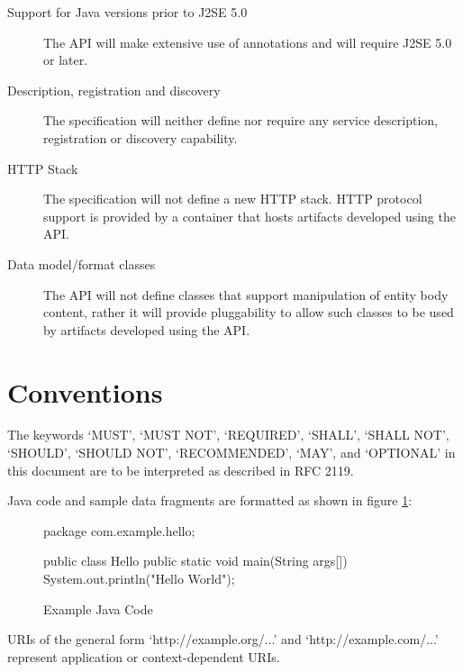 \begin{description}

\item[Support for Java versions prior to J2SE 5.0] The API will make extensive use of annotations and will require J2SE 5.0 or later.

\item[Description, registration and discovery] The specification will neither define nor require any service description, registration or discovery capability.


\item[HTTP Stack] The specification will not define a new HTTP stack. HTTP protocol support is provided by a container that hosts artifacts developed using the API.

\item[Data model/format classes] The API will not define classes that support manipulation of entity body content, rather it will provide pluggability to allow such classes to be used by artifacts developed using the API.

\end{description}

\section{Conventions}

The keywords `MUST', `MUST NOT', `REQUIRED', `SHALL', `SHALL NOT', `SHOULD', `SHOULD NOT', `RECOMMENDED', `MAY', and `OPTIONAL' in this document are to be interpreted as described in RFC 2119\cite{rfc2119}. 

Java code and sample data fragments are formatted as shown in figure \ref{ex1}:

\begin{figure}[hbtp]
\caption{Example Java Code}
\label{ex1}
\begin{listing}{1}
package com.example.hello;

public class Hello {
    public static void main(String args[]) {
        System.out.println("Hello World");
    }
}\end{listing}
\end{figure}

URIs of the general form `http://example.org/...' and `http://example.com/...' represent application or context-dependent URIs.

